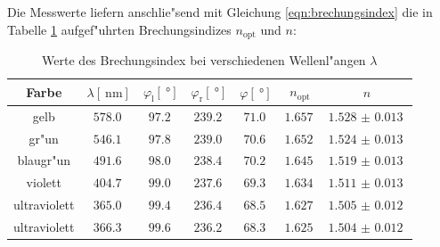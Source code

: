 		Die Messwerte liefern anschlie"send mit Gleichung \eqref{eqn:brechungsindex} die in Tabelle \ref{table:brechungsindizes} aufgef"uhrten Brechungsindizes $n_\mathrm{opt}$ und $n$:

		\begin{table}[h!]
			\begin{center}
				\caption{Werte des Brechungsindex bei verschiedenen Wellenl"angen $\lambda$ \label{table:brechungsindizes}}
				\begin{tabular}{|c|c|c|c|c|c|c|}
					\hline
						Farbe & $\lambda [\SI{}{\nano \meter}]$ & $\varphi_\mathrm{l} [\SI{}{\degree}]$ & $\varphi_\mathrm{r} [\SI{}{\degree}]$ & $\varphi [\SI{}{\degree}]$ & $n_\mathrm{opt}$ & $n$ \\
					\hline 
					\hline
						gelb & $\SI{578.0}{}$ & $\SI{97.2}{}$ & $\SI{239.2}{}$ & $\SI{71.0}{}$ & $\SI{1.657}{}$ & $\SI{1.528(13)}{}$ \\
						gr"un & $\SI{546.1}{}$ & $\SI{97.8}{}$ & $\SI{239.0}{}$ & $\SI{70.6}{}$ & $\SI{1.652}{}$ & $\SI{1.524(13)}{}$ \\
						blaugr"un & $\SI{491.6}{}$ & $\SI{98.0}{}$ & $\SI{238.4}{}$ & $\SI{70.2}{}$ & $\SI{1.645}{}$ & $\SI{1.519(13)}{}$ \\
						violett & $\SI{404.7}{}$ & $\SI{99.0}{}$ & $\SI{237.6}{}$ & $\SI{69.3}{}$ & $\SI{1.634}{}$ & $\SI{1.511(13)}{}$ \\
						ultraviolett & $\SI{365.0}{}$ & $\SI{99.4}{}$ & $\SI{236.4}{}$ & $\SI{68.5}{}$ & $\SI{1.627}{}$ & $\SI{1.505(12)}{}$ \\
						ultraviolett & $\SI{366.3}{}$ & $\SI{99.6}{}$ & $\SI{236.2}{}$ & $\SI{68.3}{}$ & $\SI{1.625}{}$ & $\SI{1.504(12)}{}$ \\
					\hline 
				\end{tabular}
			\end{center}
		\end{table}


